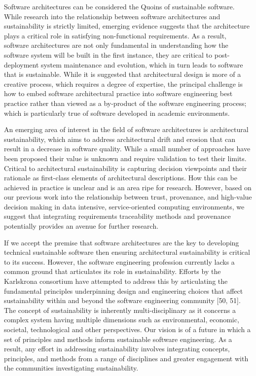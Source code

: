 \documentclass[preprint,12pt,authoryear]{elsarticle}
\begin{document}
Software architectures can be considered the Quoins of sustainable
software. While research into the relationship between software
architectures and sustainability is strictly limited, emerging
evidence suggests that the architecture plays a critical role in
satisfying non-functional requirements. As a result, software
architectures are not only fundamental in understanding how the
software system will be built in the first instance, they are critical
to post-deployment system maintenance and evolution, which in turn
leads to software that is sustainable. While it is suggested that
architectural design is more of a creative process, which requires a
degree of expertise, the principal challenge is how to embed software
architectural practice into software engineering best practice rather
than viewed as a by-product of the software engineering process; which
is particularly true of software developed in academic environments.

An emerging area of interest in the field of software architectures is
architectural sustainability, which aims to address architectural
drift and erosion that can result in a decrease in software
quality. While a small number of approaches have been proposed their
value is unknown and require validation to test their limits. Critical
to architectural sustainability is capturing decision viewpoints and
their rationale as first-class elements of architectural
descriptions. How this can be achieved in practice is unclear and is
an area ripe for research. However, based on our previous work into
the relationship between trust, provenance, and high-value decision
making in data intensive, service-oriented computing environments, we
suggest that integrating requirements traceability methods and
provenance potentially provides an avenue for further research.

If we accept the premise that software architectures are the key to
developing technical sustainable software then ensuring architectural
sustainability is critical to its success. However, the software
engineering profession currently lacks a common ground that
articulates its role in sustainability. Efforts by the Karlskrona
consortium have attempted to address this by articulating the
fundamental principles underpinning design and engineering choices
that affect sustainability within and beyond the software engineering
community [50, 51]. The concept of sustainability is inherently
multi-disciplinary as it concerns a complex system having multiple
dimensions such as environmental, economic, societal, technological
and other perspectives. Our vision is of a future in which a set of
principles and methods inform sustainable software engineering. As a
result, any effort in addressing sustainability involves integrating
concepts, principles, and methods from a range of disciplines and
greater engagement with the communities investigating sustainability.
\end{document}
